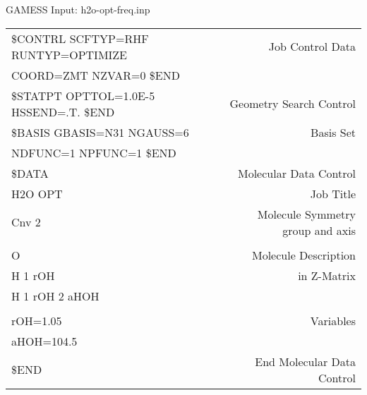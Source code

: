 \documentclass[slidestop,mathserif,compress,xcolor=svgnames]{beamer}
\newenvironment{eblock}[0]
{
\begin{beamerboxesrounded}[upper=uppercol2,lower=lowercol2,shadow=true]}
{\end{beamerboxesrounded}}
\begin{document}
\begin{frame}
  \begin{columns}
    \column{11cm}
    \begin{eblock}{GAMESS Input: h2o-opt-freq.inp}
      {\scriptsize
      \begin{tabular}{lr}
	\$CONTRL SCFTYP=RHF RUNTYP=OPTIMIZE       & {\color{red}Job Control Data} \\
	\quad COORD=ZMT NZVAR=0 \$END             & {\color{red}} \\
	\$STATPT OPTTOL=1.0E-5 HSSEND=.T. \$END   & {\color{red}Geometry Search Control} \\
	\$BASIS GBASIS=N31 NGAUSS=6               & {\color{red}Basis Set} \\
	\quad NDFUNC=1 NPFUNC=1 \$END             & {\color{red}} \\
	\$DATA                                    & {\color{red}Molecular Data Control} \\
	H2O OPT                                   & {\color{red}Job Title} \\
	Cnv 2                                     & {\color{red}Molecule Symmetry group and axis} \\
						  & {\color{red}} \\
	O                                         & {\color{red}Molecule Description} \\
	H 1 rOH                                   & {\color{red}in Z-Matrix} \\
	H 1 rOH 2 aHOH                            & {\color{red}} \\
						  & {\color{red}} \\
	rOH=1.05                                  & {\color{red}Variables} \\
	aHOH=104.5                                & {\color{red}} \\
	\$END                                     & {\color{red}End Molecular Data Control} \\
      \end{tabular}
      }
    \end{eblock}
  \end{columns}
\end{frame}
\end{document}
